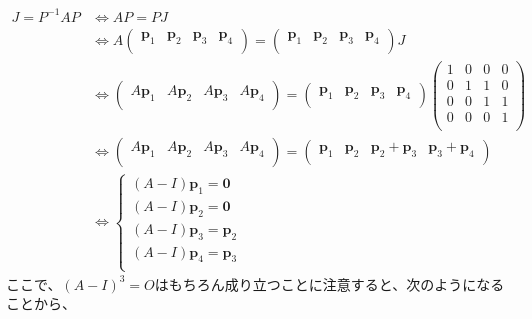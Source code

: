 \documentclass[dvipdfmx]{jsarticle}
\begin{document}
\begin{align*}
J = P^{- 1}AP &\Leftrightarrow AP = PJ\\
&\Leftrightarrow A\begin{pmatrix}
\mathbf{p}_{1} & \mathbf{p}_{2} & \mathbf{p}_{3} & \mathbf{p}_{4} \\
\end{pmatrix} = \begin{pmatrix}
\mathbf{p}_{1} & \mathbf{p}_{2} & \mathbf{p}_{3} & \mathbf{p}_{4} \\
\end{pmatrix}J\\
&\Leftrightarrow \begin{pmatrix}
A\mathbf{p}_{1} & A\mathbf{p}_{2} & A\mathbf{p}_{3} & A\mathbf{p}_{4} \\
\end{pmatrix} = \begin{pmatrix}
\mathbf{p}_{1} & \mathbf{p}_{2} & \mathbf{p}_{3} & \mathbf{p}_{4} \\
\end{pmatrix}\begin{pmatrix}
1 & 0 & 0 & 0 \\
0 & 1 & 1 & 0 \\
0 & 0 & 1 & 1 \\
0 & 0 & 0 & 1 \\
\end{pmatrix}\\
&\Leftrightarrow \begin{pmatrix}
A\mathbf{p}_{1} & A\mathbf{p}_{2} & A\mathbf{p}_{3} & A\mathbf{p}_{4} \\
\end{pmatrix} = \begin{pmatrix}
\mathbf{p}_{1} & \mathbf{p}_{2} & \mathbf{p}_{2} + \mathbf{p}_{3} & \mathbf{p}_{3} + \mathbf{p}_{4} \\
\end{pmatrix}\\
&\Leftrightarrow \left\{ \begin{matrix}
(A - I)\mathbf{p}_{1} = \mathbf{0} \\
(A - I)\mathbf{p}_{2} = \mathbf{0} \\
(A - I)\mathbf{p}_{3} = \mathbf{p}_{2} \\
(A - I)\mathbf{p}_{4} = \mathbf{p}_{3} \\
\end{matrix} \right.
\end{align*}
ここで、$(A - I)^{3} = O$はもちろん成り立つことに注意すると、次のようになることから、
\end{document}
